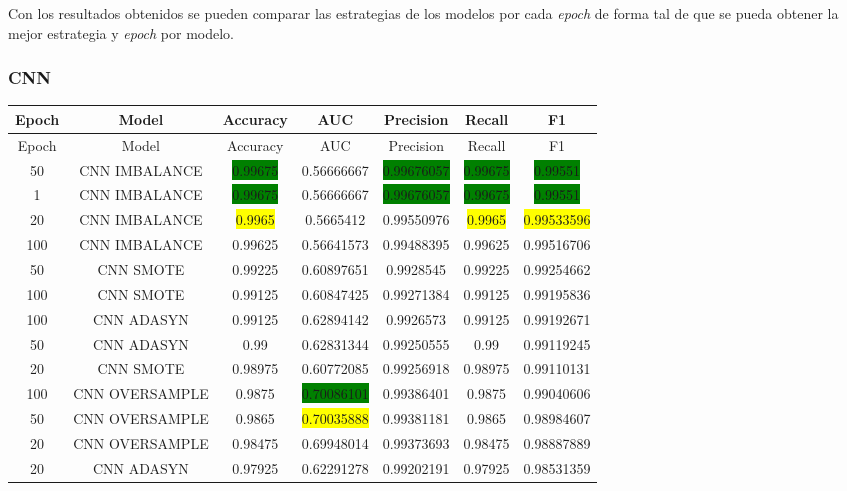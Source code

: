   Con los resultados obtenidos se pueden comparar las estrategias de los modelos por cada \textit{epoch} de forma tal de que se pueda obtener la mejor estrategia y \textit{epoch} por modelo.
  
  \subsubsection{CNN}
  \begin{longtable}{|c|c|c|c|c|c|c|}
  	\hline
  	Epoch & Model & Accuracy & AUC & Precision & Recall & F1\\ \hline
  	\endfirsthead
  	\hline
  	Epoch & Model & Accuracy & AUC & Precision & Recall & F1\\ \hline
  	\endhead
  	50 & CNN IMBALANCE & \colorbox{green}{0.99675} & 0.56666667 & \colorbox{green}{0.99676057} & \colorbox{green}{0.99675} & \colorbox{green}{0.99551}\\ \hline
  	1 & CNN IMBALANCE & \colorbox{green}{0.99675} & 0.56666667 & \colorbox{green}{0.99676057} & \colorbox{green}{0.99675} & \colorbox{green}{0.99551}\\ \hline
  	20 & CNN IMBALANCE & \colorbox{yellow}{0.9965} & 0.5665412 & 0.99550976 & \colorbox{yellow}{0.9965} & \colorbox{yellow}{0.99533596}\\ \hline
  	100 & CNN IMBALANCE & 0.99625 & 0.56641573 & 0.99488395 & 0.99625 & 0.99516706\\ \hline
  	50 & CNN SMOTE & 0.99225 & 0.60897651 & 0.9928545 & 0.99225 & 0.99254662\\ \hline
  	100 & CNN SMOTE & 0.99125 & 0.60847425 & 0.99271384 & 0.99125 & 0.99195836\\ \hline
  	100 & CNN ADASYN & 0.99125 & 0.62894142 & 0.9926573 & 0.99125 & 0.99192671\\ \hline
  	50 & CNN ADASYN & 0.99 & 0.62831344 & 0.99250555 & 0.99 & 0.99119245\\ \hline
  	20 & CNN SMOTE & 0.98975 & 0.60772085 & 0.99256918 & 0.98975 & 0.99110131\\ \hline
  	100 & CNN OVERSAMPLE & 0.9875 & \colorbox{green}{0.70086101} & 0.99386401 & 0.9875 & 0.99040606\\ \hline
  	50 & CNN OVERSAMPLE & 0.9865 & \colorbox{yellow}{0.70035888} & 0.99381181 & 0.9865 & 0.98984607\\ \hline
  	20 & CNN OVERSAMPLE & 0.98475 & 0.69948014 & 0.99373693 & 0.98475 & 0.98887889\\ \hline
  	20 & CNN ADASYN & 0.97925 & 0.62291278 & 0.99202191 & 0.97925 & 0.98531359\\ \hline

\end{longtable}
